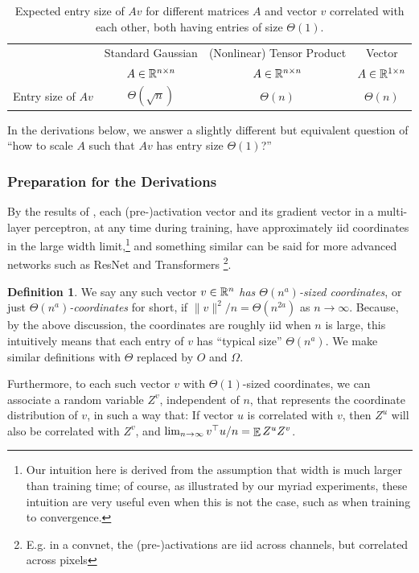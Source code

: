 \documentclass{article}
\theoremstyle{definition}
\newtheorem{defn}{Definition}[section]
\DeclareMathOperator*{\EV}{\mathbb{E}}
\begin{document}
    \begin{table}
    \centering
    \caption[Expected output size of matrix multiplication between different types of random matrices and a random vector, as preparation for deriving $\mu$P]{Expected entry size of $Av$ for different matrices $A$ and vector $v$ correlated with each other, both having entries of size $\Theta(1)$.}
    \label{tab:mat}
        \begin{tabular}{cccc}
        \toprule
        & Standard Gaussian & (Nonlinear) Tensor Product & Vector\tabularnewline
        & $A\in\mathbb{R}^{n\times n}$ & $A\in\mathbb{R}^{n\times n}$ & $A\in\mathbb{R}^{1\times n}$\tabularnewline
        \midrule
        Entry size of $Av$ & $\Theta(\sqrt{n})$ & $\Theta(n)$ & $\Theta(n)$\tabularnewline
        \bottomrule
        \end{tabular}
    \end{table}
    In the derivations below, we answer a slightly different but equivalent question of ``how to scale $A$ such that $Av$ has entry size $\Theta(1)$?''
    
    \subsubsection{Preparation for the Derivations}
    
    By the results of \citep{TP4}, each (pre-)activation vector and its gradient vector in a multi-layer perceptron, at any time during training, have approximately iid coordinates in the large width limit,\footnote{Our intuition here is derived from the assumption that width is much larger than training time; of course, as illustrated by our myriad experiments, these intuition are very useful even when this is not the case, such as when training to convergence.} and something similar can be said for more advanced networks such as ResNet and Transformers \footnote{E.g. in a convnet, the (pre-)activations are iid across channels, but correlated across pixels}.
    
    \begin{defn}\label{defn:ThetaSize}
      We say any such vector $v \in \mathbb{R}^n$ \emph{has $\Theta(n^a)$-sized coordinates}, or just \emph{$\Theta(n^a)$-coordinates} for short, if $\|v\|^2/n = \Theta(n^{2a})$ as $n \to \infty$.
      Because, by the above discussion, the coordinates are roughly iid when $n$ is large, this intuitively means that each entry of $v$ has ``typical size'' $\Theta(n^a)$.
      We make similar definitions with $\Theta$ replaced by $O$ and $\Omega$.
      
      Furthermore, to each such vector $v$ with $\Theta(1)$-sized coordinates, we can associate a random variable $Z^{v}$, independent of $n$, that represents the coordinate distribution of $v$, in such a way that: If vector $u$ is correlated with $v$, then $Z^{u}$ will also be correlated with $Z^{v}$, and $\lim_{n\to\infty}v^{\trsp}u/n=\EV Z^{u}Z^{v}$.        
    \end{defn}
\end{document}
